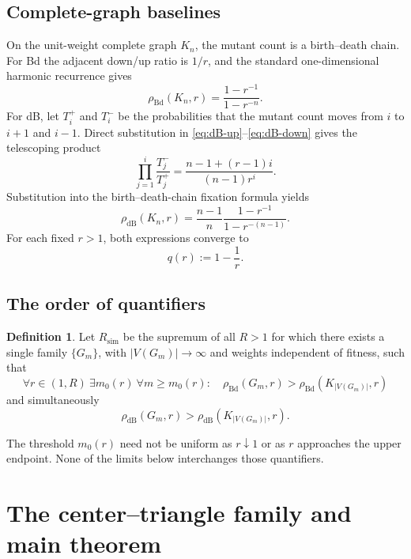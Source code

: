 \documentclass[11pt]{article}
\theoremstyle{definition}
\newtheorem{definition}[theorem]{Definition}
\theoremstyle{remark}
\newcommand{\Bd}{\mathrm{Bd}}
\newcommand{\dB}{\mathrm{dB}}
\begin{document}
\subsection{Complete-graph baselines}

On the unit-weight complete graph $K_n$, the mutant count is a birth--death
chain.  For Bd the adjacent down/up ratio is $1/r$, and the standard
one-dimensional harmonic recurrence gives
\begin{equation}
 \rho_{\Bd}(K_n,r)=\frac{1-r^{-1}}{1-r^{-n}}.
 \label{eq:complete-Bd}
\end{equation}
For dB, let $T_i^+$ and $T_i^-$ be the probabilities that the mutant count
moves from $i$ to $i+1$ and $i-1$.  Direct substitution in
\eqref{eq:dB-up}--\eqref{eq:dB-down} gives the telescoping product
\[
 \prod_{j=1}^{i}\frac{T_j^-}{T_j^+}
 =\frac{n-1+(r-1)i}{(n-1)r^i}.
\]
Substitution into the birth--death-chain fixation formula yields
\begin{equation}
 \rho_{\dB}(K_n,r)
 =\frac{n-1}{n}\frac{1-r^{-1}}{1-r^{-(n-1)}}.
 \label{eq:complete-dB}
\end{equation}
For each fixed $r>1$, both expressions converge to
\begin{equation}
 q(r):=1-\frac1r.
 \label{eq:q}
\end{equation}

\subsection{The order of quantifiers}

\begin{definition}
Let $R_{\mathrm{sim}}$ be the supremum of all $R>1$ for which there exists a
single family $\{G_m\}$, with $|V(G_m)|\to\infty$ and weights independent of
fitness, such that
\[
 \forall r\in(1,R)\ \exists m_0(r)\ \forall m\geq m_0(r):
 \quad
 \rho_{\Bd}(G_m,r)>\rho_{\Bd}(K_{|V(G_m)|},r)
\]
and simultaneously
\[
 \rho_{\dB}(G_m,r)>\rho_{\dB}(K_{|V(G_m)|},r).
\]
\end{definition}

The threshold $m_0(r)$ need not be uniform as $r\downarrow1$ or as $r$
approaches the upper endpoint.  None of the limits below interchanges those
quantifiers.

\section{The center--triangle family and main theorem}
\end{document}
